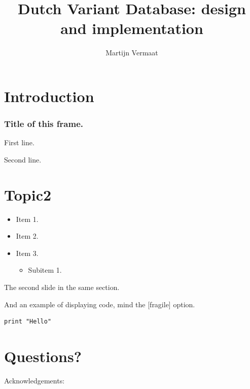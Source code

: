 \documentclass[slidestop]{beamer}
\title{Dutch Variant Database: design and implementation}
\author{Martijn Vermaat}
\begin{document}

\bodytemplate

\section{Introduction}
\begin{frame}
 \frametitle{Title of this frame.}
 First line.

 \pause

 Second line.
\end{frame}

\section{Topic2}
\begin{frame}
  \begin{itemize}
    \item Item 1.
    \item Item 2.
    \pause
    \item Item 3.
    \pause
    \begin{itemize}
      \item Subitem 1.
    \end{itemize}
  \end{itemize}
\end{frame}

\begin{frame}
  The second slide in the same section.
\end{frame}

\begin{frame}[fragile]
  And an example of displaying code, mind the [fragile] option.

  \begin{lstlisting}[caption = {Example input}]
    print "Hello"
  \end{lstlisting}
\end{frame}

\section{Questions?}
\lastpagetemplate
\begin{frame}
  \begin{center}
    Acknowledgements:
    \bigskip
    \bigskip

  \end{center}
\end{frame}
\end{document}
